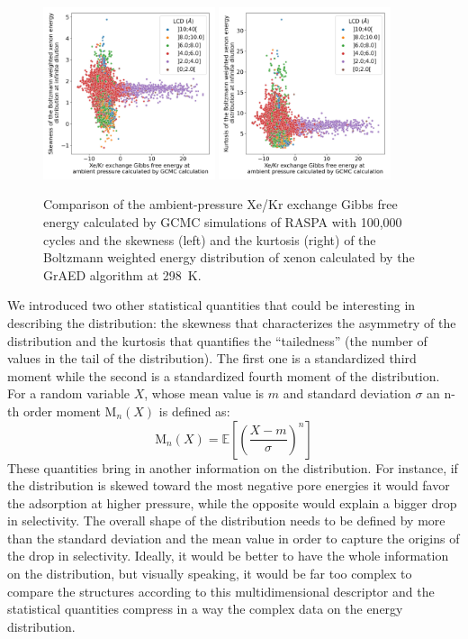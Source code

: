 \documentclass[main]{subfiles}
\begin{document}
\begin{figure}[ht]
  \centering
    \includegraphics[width=0.45\textwidth]{figures/3-fastsim/G_2080_vs_enthalpy_skew_overview.jpg}
    \includegraphics[width=0.45\textwidth]{figures/3-fastsim/G_2080_vs_enthalpy_kurt_overview.jpg}
    \caption{Comparison of the ambient-pressure Xe/Kr exchange Gibbs free energy calculated by GCMC simulations of RASPA with 100,000 cycles and the skewness (left) and the kurtosis (right) of the Boltzmann weighted energy distribution of xenon calculated by the GrAED algorithm at \SI{298}{\kelvin}.}\label{fgr:enthalpy_skew_kurt}
\end{figure}

We introduced two other statistical quantities that could be interesting in describing the distribution: the skewness that characterizes the asymmetry of the distribution and the kurtosis that quantifies the ``tailedness'' (the number of values in the tail of the distribution). The first one is a standardized third moment while the second is a standardized fourth moment of the distribution. For a random variable $X$, whose mean value is $m$ and standard deviation $\sigma$ an n-th order moment $\text{M}_{n}(X)$ is defined as:
\begin{equation}
  \text{M}_n(X) = \mathbb{E}\left[\left(\dfrac{X-m}{\sigma}\right)^n\right]
\end{equation}
These quantities bring in another information on the distribution. For instance, if the distribution is skewed toward the most negative pore energies it would favor the adsorption at higher pressure, while the opposite would explain a bigger drop in selectivity. The overall shape of the distribution needs to be defined by more than the standard deviation and the mean value in order to capture the origins of the drop in selectivity. Ideally, it would be better to have the whole information on the distribution, but visually speaking, it would be far too complex to compare the structures according to this multidimensional descriptor and the statistical quantities compress in a way the complex data on the energy distribution.
\end{document}
